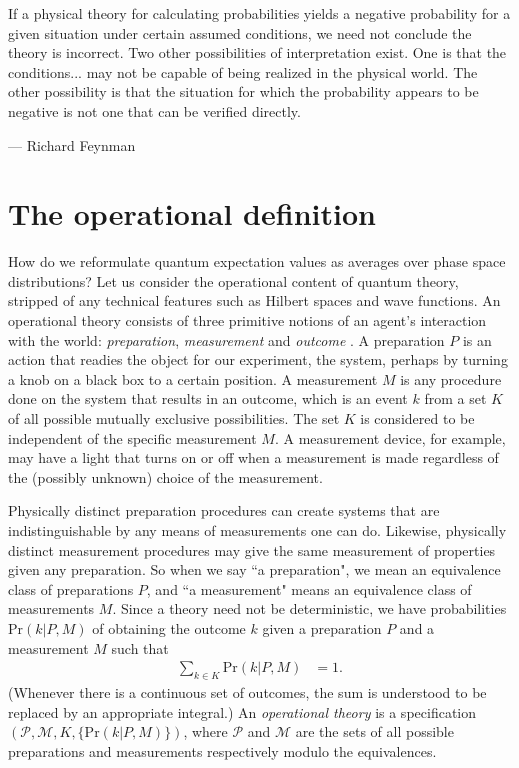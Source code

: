 \setlength\epigraphwidth{8.5cm}
\epigraph{If a physical theory for calculating probabilities yields a negative probability for a given situation under certain assumed conditions, we need not conclude the theory is incorrect. Two other possibilities of interpretation exist. One is that the conditions... may not be capable of being realized in the physical world. The other possibility is that the situation for which the probability appears to be negative is not one that can be verified directly.}{--- \textup{Richard Feynman}}

\section{The operational definition}

How do we reformulate quantum expectation values as averages over phase space distributions? Let us consider the operational content of quantum theory, stripped of any technical features such as Hilbert spaces and wave functions. An operational theory consists of three primitive notions of an agent's interaction with the world: \emph{preparation}, \emph{measurement} and \emph{outcome} \cite{hardy_quantum_2001, spekkens_contextuality_2005, ferrie_quasi-probability_2011}. A preparation $P$ is an action that readies the object for our experiment, the system, perhaps by turning a knob on a black box to a certain position. A measurement $M$ is any procedure done on the system that results in an outcome, which is an event $k$ from a set $K$ of all possible mutually exclusive possibilities. The set $K$ is considered to be independent of the specific measurement $M$. A measurement device, for example, may have a light that turns on or off when a measurement is made regardless of the (possibly unknown) choice of the measurement.

Physically distinct preparation procedures can create systems that are indistinguishable by any means of measurements one can do. Likewise, physically distinct measurement procedures may give the same measurement of properties given any preparation. So when we say ``a preparation", we mean an equivalence class of preparations $P$, and ``a measurement" means an equivalence class of measurements $M$. Since a theory need not be deterministic, we have probabilities $\text{Pr}(k|P,M)$ of obtaining the outcome $k$ given a preparation $P$ and a measurement $M$ such that
\begin{align}
\sum_{k \in K} \text{Pr} (k|P,M) &= 1.
\end{align}
(Whenever there is a continuous set of outcomes, the sum is understood to be replaced by an appropriate integral.)
An \emph{operational theory} is a specification $(\mathcal{P}, \mathcal{M}, K, \allowbreak \{\text{Pr}(k|P,M)\})$, where $\mathcal{P}$ and $\mathcal{M}$ are the sets of all possible preparations and measurements respectively modulo the equivalences. %


